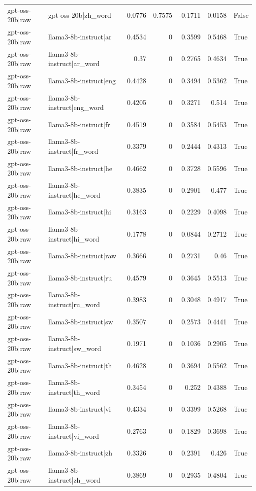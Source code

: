 \begin{table}
\begin{tabular}{l l r r r r l}
gpt-oss-20b|raw & gpt-oss-20b|zh_word & -0.0776 & 0.7575 & -0.1711 & 0.0158 & False \\
gpt-oss-20b|raw & llama3-8b-instruct|ar & 0.4534 & 0 & 0.3599 & 0.5468 & True \\
gpt-oss-20b|raw & llama3-8b-instruct|ar_word & 0.37 & 0 & 0.2765 & 0.4634 & True \\
gpt-oss-20b|raw & llama3-8b-instruct|eng & 0.4428 & 0 & 0.3494 & 0.5362 & True \\
gpt-oss-20b|raw & llama3-8b-instruct|eng_word & 0.4205 & 0 & 0.3271 & 0.514 & True \\
gpt-oss-20b|raw & llama3-8b-instruct|fr & 0.4519 & 0 & 0.3584 & 0.5453 & True \\
gpt-oss-20b|raw & llama3-8b-instruct|fr_word & 0.3379 & 0 & 0.2444 & 0.4313 & True \\
gpt-oss-20b|raw & llama3-8b-instruct|he & 0.4662 & 0 & 0.3728 & 0.5596 & True \\
gpt-oss-20b|raw & llama3-8b-instruct|he_word & 0.3835 & 0 & 0.2901 & 0.477 & True \\
gpt-oss-20b|raw & llama3-8b-instruct|hi & 0.3163 & 0 & 0.2229 & 0.4098 & True \\
gpt-oss-20b|raw & llama3-8b-instruct|hi_word & 0.1778 & 0 & 0.0844 & 0.2712 & True \\
gpt-oss-20b|raw & llama3-8b-instruct|raw & 0.3666 & 0 & 0.2731 & 0.46 & True \\
gpt-oss-20b|raw & llama3-8b-instruct|ru & 0.4579 & 0 & 0.3645 & 0.5513 & True \\
gpt-oss-20b|raw & llama3-8b-instruct|ru_word & 0.3983 & 0 & 0.3048 & 0.4917 & True \\
gpt-oss-20b|raw & llama3-8b-instruct|sw & 0.3507 & 0 & 0.2573 & 0.4441 & True \\
gpt-oss-20b|raw & llama3-8b-instruct|sw_word & 0.1971 & 0 & 0.1036 & 0.2905 & True \\
gpt-oss-20b|raw & llama3-8b-instruct|th & 0.4628 & 0 & 0.3694 & 0.5562 & True \\
gpt-oss-20b|raw & llama3-8b-instruct|th_word & 0.3454 & 0 & 0.252 & 0.4388 & True \\
gpt-oss-20b|raw & llama3-8b-instruct|vi & 0.4334 & 0 & 0.3399 & 0.5268 & True \\
gpt-oss-20b|raw & llama3-8b-instruct|vi_word & 0.2763 & 0 & 0.1829 & 0.3698 & True \\
gpt-oss-20b|raw & llama3-8b-instruct|zh & 0.3326 & 0 & 0.2391 & 0.426 & True \\
gpt-oss-20b|raw & llama3-8b-instruct|zh_word & 0.3869 & 0 & 0.2935 & 0.4804 & True \\

\end{tabular}
\end{table}
